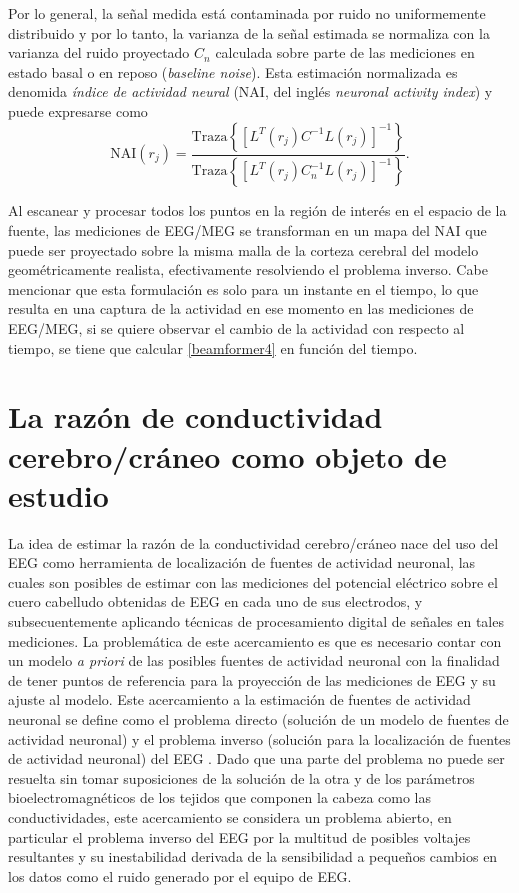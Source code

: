 Por lo general, la señal medida está contaminada por ruido no uniformemente distribuido y por lo tanto, la varianza de la señal estimada se normaliza con la varianza del ruido proyectado $C_n$ calculada sobre parte de las mediciones en estado basal o en reposo (\emph{baseline noise}). 
Esta estimación normalizada es denomida \emph{índice de actividad neural} (NAI, del inglés \emph{neuronal activity index}) \cite{VanVeen1997} y puede expresarse como
\begin{equation}
	\label{beamformer4}
	\text{NAI}(r_j) = \frac{\text{Traza}\left\{[L^{T}(r_j)C^{-1}L(r_j)]^{-1}\right\}}{\text{Traza}\left\{[L^{T}(r_j)C_n^{-1}L(r_j)]^{-1}\right\}} \text{.}
\end{equation}

Al escanear y procesar todos los puntos en la región de interés en el espacio de la fuente, las mediciones de EEG/MEG se transforman en un mapa del NAI que puede ser proyectado sobre la misma malla de la corteza cerebral del modelo geométricamente realista, efectivamente resolviendo el problema inverso. 
Cabe mencionar que esta formulación es solo para un instante en el tiempo, lo que resulta en una captura de la actividad en ese momento en las mediciones de EEG/MEG, si se quiere observar el cambio de la actividad con respecto al tiempo, se tiene que calcular \cref{beamformer4} en función del tiempo.

\section{La razón de conductividad cerebro/cráneo como objeto de estudio}
\label{sec:intro:study}

La idea de estimar la razón de la conductividad cerebro/cráneo nace del uso del EEG como herramienta de localización de fuentes de actividad neuronal, las cuales son posibles de estimar con las mediciones del potencial eléctrico sobre el cuero cabelludo obtenidas de EEG en cada uno de sus electrodos, y subsecuentemente aplicando técnicas de procesamiento digital de señales en tales mediciones. 
La problemática de este acercamiento es que es necesario contar con un modelo \emph{a priori} de las posibles fuentes de actividad neuronal con la finalidad de tener puntos de referencia para la proyección de las mediciones de EEG y su ajuste al modelo. 
Este acercamiento a la estimación de fuentes de actividad neuronal se define como el problema directo (solución de un modelo de fuentes de actividad neuronal) y el problema inverso (solución para la localización de fuentes de actividad neuronal) del EEG \cite{Hallez2007}. 
Dado que una parte del problema no puede ser resuelta sin tomar suposiciones de la solución de la otra y de los parámetros bioelectromagnéticos de los tejidos que componen la cabeza como las conductividades, este acercamiento se considera un problema abierto, en particular el problema inverso del EEG por la multitud de posibles voltajes resultantes y su inestabilidad derivada de la sensibilidad a pequeños cambios en los datos como el ruido generado por el equipo de EEG.

